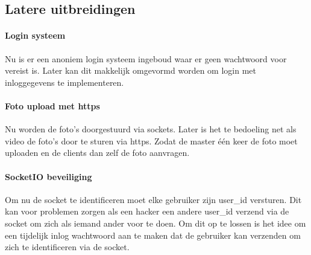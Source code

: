 \subsection{Latere uitbreidingen}
\paragraph{Login systeem} Nu is er een anoniem login systeem ingeboud waar er geen wachtwoord voor vereist is. Later kan dit makkelijk omgevormd worden om login met inloggegevens te implementeren.
\paragraph{Foto upload met https} Nu worden de foto's doorgestuurd via sockets. Later is het te bedoeling net als video de foto's door te sturen via https. Zodat de master één keer de foto moet uploaden en de clients dan zelf de foto aanvragen.
\paragraph{SocketIO beveiliging} Om nu de socket te identificeren moet elke gebruiker zijn user\_id versturen. Dit kan voor problemen zorgen als een hacker een andere user\_id verzend via de socket om zich als iemand ander voor te doen. Om dit op te lossen is het idee om een tijdelijk inlog wachtwoord aan te maken dat de gebruiker kan verzenden om zich te identificeren via de socket. 
 
 
 
 
 